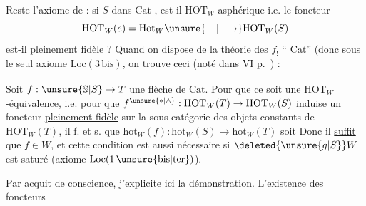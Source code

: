 Reste l'axiome de  : si $S$ dans $\mathrm{Cat}$ , est-il $\mathrm{HOT}_W$-asphérique i.e. le foncteur
\[
\mathrm{HOT}_W(e)=\mathrm{Hot}_W\unsure{\relbar|\longrightarrow}\mathrm{HOT}_W(S)
\]
est-il pleinement fidèle ? Quand on dispose  de la théorie des $f_!$ `` $\mathrm{Cat}$'' (donc sous le seul axiome $\underline{\mathrm{Loc}(3\,\mathrm{bis})}$, on trouve ceci (noté dans $\underline{\overline{\mathrm{VI}}}$ p.~) :

Soit $f:\unsure{\mathbb{S}|S}\to T$ une flèche de $\mathrm{Cat}$. Pour que ce soit une $\mathrm{HOT}_W$-équivalence, i.e. pour que $f^{\unsure{*|\wedge}}:\mathrm{HOT}_W(T)\to\mathrm{HOT}_W(S)$ induise un foncteur \uline{pleinement fidèle} sur la sous-catégorie des objets constants de $\mathrm{HOT}_W(T)$, il f. et s. que $\mathrm{hot}_W(f):\mathrm{hot}_W(S)\longrightarrow\mathrm{hot}_W(T)$ soit  Donc il \uline{suffit} que $f\in W$, et cette condition est aussi nécessaire si $\deleted{\unsure{g|S}}W$ est  saturé (axiome $\mathrm{Loc}(1\,\unsure{\mathrm{bis}|\mathrm{ter}})$).

Par acquit de conscience, j'explicite ici la démonstration. L'existence des foncteurs
